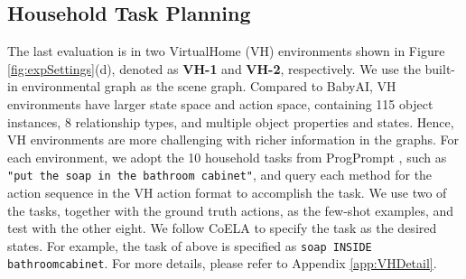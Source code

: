 \subsection{Household Task Planning}
The last evaluation is in two VirtualHome (VH) \citep{virtualhome} environments shown in Figure \ref{fig:expSettings}(d), denoted as \textbf{VH-1} and \textbf{VH-2}, respectively. We use the built-in environmental graph as the scene graph. Compared to BabyAI, VH environments have larger state space and action space, containing 115 object instances, 8 relationship types, and multiple object properties and states. Hence, VH environments are more challenging with richer information in the graphs.
For each environment, we adopt the 10 household tasks from ProgPrompt \citep{progprompt}, such as \texttt{\small "put the soap in the bathroom cabinet"}, and query each method for the action sequence in the VH action format to accomplish the task. 
We use two of the tasks, together with the ground truth actions, as the few-shot examples, and test with the other eight. We follow CoELA \cite{coopEmbod} to specify the task as the desired states. For example, the task of above is specified as \texttt{\small soap INSIDE bathroomcabinet}. 
For more details, please refer to Appendix \ref{app:VHDetail}.
